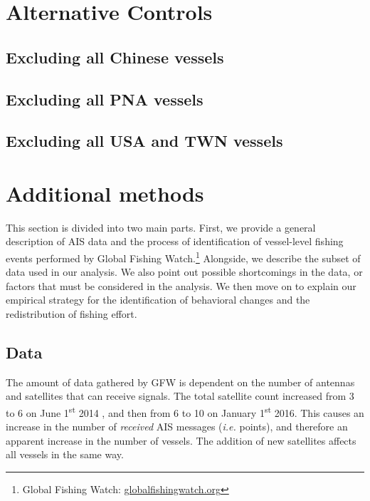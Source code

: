 \documentclass[9p,twocolumn,twoside,lineno]{pnas-new}
\begin{document}
\clearpage

\section{Alternative Controls}
\subsection{Excluding all Chinese vessels}



\clearpage
\subsection{Excluding all PNA vessels}



\clearpage

\subsection{Excluding all USA and TWN vessels}



\clearpage

\section{Additional methods}

This section is divided into two main parts. First, we provide a general description of AIS data and the process of identification of vessel-level fishing events performed by Global Fishing Watch.\footnote{Global Fishing Watch: \url{globalfishingwatch.org}} Alongside, we describe the subset of data used in our analysis. We also point out possible shortcomings in the data, or factors that must be considered in the analysis. We then move on to explain our empirical strategy for the identification of behavioral changes and the redistribution of fishing effort.

\subsection{Data}

The amount of data gathered by GFW is dependent on the number of antennas and satellites that can receive signals. The total satellite count increased from 3 to 6 on June 1\textsuperscript{st} 2014 , and then from 6 to 10 on January 1\textsuperscript{st} 2016. This causes an increase in the number of \emph{received} AIS messages (\emph{i.e.} points), and therefore an apparent increase in the number of vessels. The addition of new satellites affects all vessels in the same way. 
\end{document}
